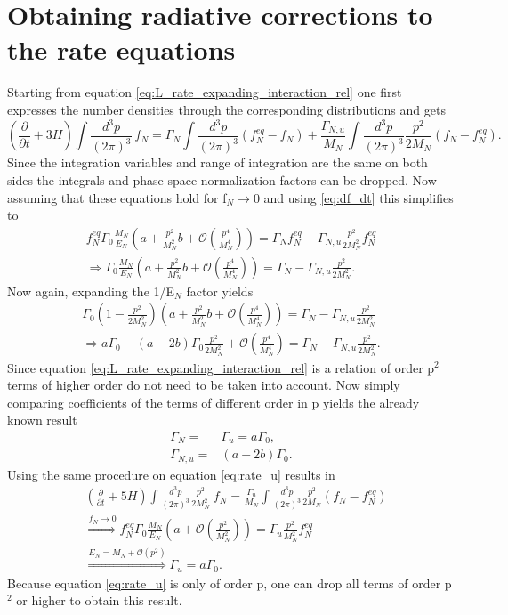 \section{Obtaining radiative corrections to the rate equations}
\label{ap:rad_corrections}
Starting from equation \eqref{eq:L_rate_expanding_interaction_rel} one first expresses the number densities through the corresponding distributions and gets
\begin{equation*}
	\left(\frac{\partial}{\partial t}+3H\right)\int\frac{d^3p}{\left(2\pi\right)^3}\:f_N=\Gamma_N\int\frac{d^3p}{\left(2\pi\right)^3}\left(f_N^{eq}-f_N\right)+\frac{\Gamma_{N,u}}{M_N}\int\frac{d^3p}{\left(2\pi\right)^3}\frac{p^2}{2M_N}\left(f_N-f_N^{eq}\right).
\end{equation*}
Since the integration variables and range of integration are the same on both sides the integrals and phase space normalization factors can be dropped. Now assuming that these equations hold for f$_N\rightarrow0$ and using \eqref{eq:df_dt} this simplifies to 
\begin{align*}
	f_N^{eq}\Gamma_0\frac{M_N}{E_N}\left(a+\frac{p^2}{M_N^2}b+\mathcal{O}\left(\frac{p^4}{M_N^4}\right)\right)=\Gamma_Nf_N^{eq}-\Gamma_{N,u}\frac{p^2}{2M_N^2}f_N^{eq}\\
	\Rightarrow\Gamma_0\frac{M_N}{E_N}\left(a+\frac{p^2}{M_N^2}b+\mathcal{O}\left(\frac{p^4}{M_N^4}\right)\right)=\Gamma_N-\Gamma_{N,u}\frac{p^2}{2M_N^2}.
\end{align*}
Now again, expanding the 1/E$_N$ factor yields
\begin{align*}
	\Gamma_0\left(1-\frac{p^2}{2M_N^2}\right)\left(a+\frac{p^2}{M_N^2}b+\mathcal{O}\left(\frac{p^4}{M_N^4}\right)\right)=\Gamma_N-\Gamma_{N,u}\frac{p^2}{2M_N^2}\\
	\Rightarrow a\Gamma_0-(a-2b)\Gamma_0\frac{p^2}{2M_N^2}+\mathcal{O}\left(\frac{p^4}{M_N^4}\right)=\Gamma_N-\Gamma_{N,u}\frac{p^2}{2M_N^2}.
\end{align*}
Since equation \eqref{eq:L_rate_expanding_interaction_rel} is a relation of order p$^2$ terms of higher order do not need to be taken into account. \newline\indent
Now simply comparing coefficients of the terms of different order in p yields the already known result
\begin{align*}
\Gamma_N=&\Gamma_u=a\Gamma_0,\\
\Gamma_{N,u}=&(a-2b)\Gamma_0.
\end{align*}
Using the same procedure on equation \eqref{eq:rate_u} results in 
\begin{align*}
&\left(\frac{\partial}{\partial t}+5H\right)\int\frac{d^3p}{\left(2\pi\right)^3}\frac{p^2}{2M_N^2}\:f_N=\frac{\Gamma_{u}}{M_N}\int\frac{d^3p}{\left(2\pi\right)^3}\frac{p^2}{2M_N}\left(f_N-f_N^{eq}\right)\\
&\overset{f_N\rightarrow0}{\Longrightarrow}f_N^{eq}\Gamma_0\frac{M_N}{E_N}\left(a+\mathcal{O}\left(\frac{p^2}{M_N^2}\right)\right)=\Gamma_{u}\frac{p^2}{M_N^2}f_N^{eq}\\
&\overset{E_N=M_N+\mathcal{O}(p^2)}{\Longrightarrow}\Gamma_u=a\Gamma_0.
\end{align*}
Because equation \eqref{eq:rate_u} is only of order p, one can drop all terms of order p$^2$ or higher to obtain this result.
